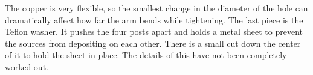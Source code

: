 \documentclass[12pt]{report}
\begin{document}
The copper is very flexible, so the smallest change in the diameter of the hole can dramatically affect how far the arm bends while tightening. The last piece is the Teflon washer. It pushes the four posts apart and holds a metal sheet to prevent the sources from depositing on each other. There is a small cut down the center of it to hold the sheet in place. The details of this have not been completely worked out.
\end{document}
